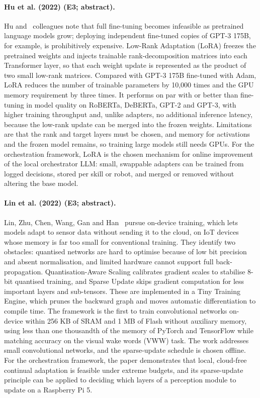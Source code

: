 \documentclass[10pt,a4paper]{article}
\begin{document}
\paragraph{Hu et al. (2022) (E3; abstract).} Hu and~\cite{Hu2022} colleagues note that full fine-tuning becomes infeasible as pretrained language models grow; deploying independent fine-tuned copies of GPT-3 175B, for example, is prohibitively expensive. Low-Rank Adaptation (LoRA) freezes the pretrained weights and injects trainable rank-decomposition matrices into each Transformer layer, so that each weight update is represented as the product of two small low-rank matrices. Compared with GPT-3 175B fine-tuned with Adam, LoRA reduces the number of trainable parameters by 10,000 times and the GPU memory requirement by three times. It performs on par with or better than fine-tuning in model quality on RoBERTa, DeBERTa, GPT-2 and GPT-3, with higher training throughput and, unlike adapters, no additional inference latency, because the low-rank update can be merged into the frozen weights. Limitations are that the rank and target layers must be chosen, and memory for activations and the frozen model remains, so training large models still needs GPUs. For the orchestration framework, LoRA is the chosen mechanism for online improvement of the local orchestrator LLM: small, swappable adapters can be trained from logged decisions, stored per skill or robot, and merged or removed without altering the base model.

\paragraph{Lin et al. (2022) (E3; abstract).} Lin, Zhu, Chen, Wang, Gan and Han~\cite{Lin2022} pursue on-device training, which lets models adapt to sensor data without sending it to the cloud, on IoT devices whose memory is far too small for conventional training. They identify two obstacles: quantised networks are hard to optimise because of low bit precision and absent normalisation, and limited hardware cannot support full back-propagation. Quantisation-Aware Scaling calibrates gradient scales to stabilise 8-bit quantised training, and Sparse Update skips gradient computation for less important layers and sub-tensors. These are implemented in a Tiny Training Engine, which prunes the backward graph and moves automatic differentiation to compile time. The framework is the first to train convolutional networks on-device within 256 KB of SRAM and 1 MB of Flash without auxiliary memory, using less than one thousandth of the memory of PyTorch and TensorFlow while matching accuracy on the visual wake words (VWW) task. The work addresses small convolutional networks, and the sparse-update schedule is chosen offline. For the orchestration framework, the paper demonstrates that local, cloud-free continual adaptation is feasible under extreme budgets, and its sparse-update principle can be applied to deciding which layers of a perception module to update on a Raspberry Pi 5.
\end{document}
